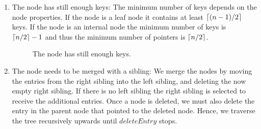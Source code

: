 \documentclass[abstracton,12pt,oneside]{scrreprt}
\DeclarePairedDelimiter\ceil{\lceil}{\rceil}
\begin{document}
\begin{enumerate}
	\item The node has still enough keys: The minimum number of keys depends on the node properties. If the node is a leaf node it contains at least $\ceil{(n-1)/2}$ keys. If the node is an internal node the minimum number of keys is $\ceil{n/2}-1$ and thus the minimum number of pointers is $\ceil{n/2}$. 
	\begin{figure}[ht!]
		\centering
		\vspace{2mm}
		\caption{The node has still enough keys.}
		\label{fig:enoughkeys}
	\end{figure} 
		
	\item The node needs to be merged with a sibling: We merge the nodes by moving the entries from the right sibling into the left sibling, and deleting the now empty right sibling. If there is no left sibling the right sibling is selected to receive the additional entries. Once a node is deleted, we must also delete the entry in the parent node that pointed to the deleted node. Hence, we traverse the tree recursively upwards  until $deleteEntry$ stops.
	

\end{enumerate}
\end{document}
